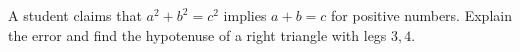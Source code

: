 A student claims that $ a^2+b^2=c^2 $ implies $ a+b=c $ for positive numbers. Explain the error and find the hypotenuse of a right triangle with legs $ 3,4 $.
